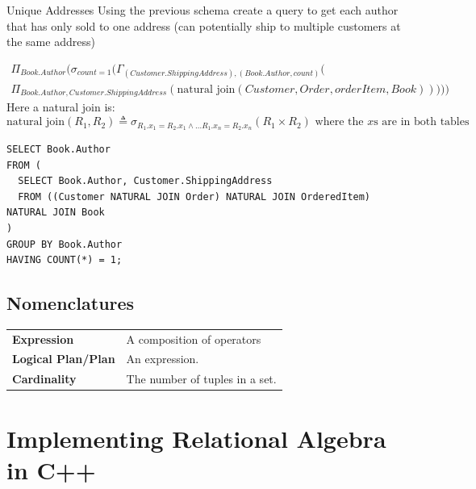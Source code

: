 \begin{examplebox}{Unique Addresses}
  Using the previous schema create a query to get each author that has only sold to one address (can potentially ship to multiple customers at the same address)   
  
  \begin{multline*}
    \Pi_{Book.Author}(
    \sigma_{count=1}(
      \Gamma_{(Customer.ShippingAddress),(Book.Author, count)}( \\
        \Pi_{Book.Author, Customer.ShippingAddress} (
          \text{natural join}(Customer, Order, orderItem, Book)
        )
      )
    )
  )
  \end{multline*}
  Here a natural join is:
  \[\text{natural join}(R_1, R_2) \triangleq \sigma_{R_1.x_1 = R_2.x_1 \land \dots R_1.x_n = R_2.x_n} (R_1 \times R_2) \text{ where the }x\text{s are in both tables}\]
  \begin{verbatim}
SELECT Book.Author
FROM (
  SELECT Book.Author, Customer.ShippingAddress
  FROM ((Customer NATURAL JOIN Order) NATURAL JOIN OrderedItem) NATURAL JOIN Book
)
GROUP BY Book.Author
HAVING COUNT(*) = 1;
  \end{verbatim}

\end{examplebox}

\subsection{Nomenclatures}
\begin{center}
  \begin{tabular}{l p{}}
    \textbf{Expression} & A composition of operators \\
    \textbf{Logical Plan/Plan} & An expression. \\
    \textbf{Cardinality} & The number of tuples in a set. \\
  \end{tabular}
\end{center}

\section{Implementing Relational Algebra in C++}


